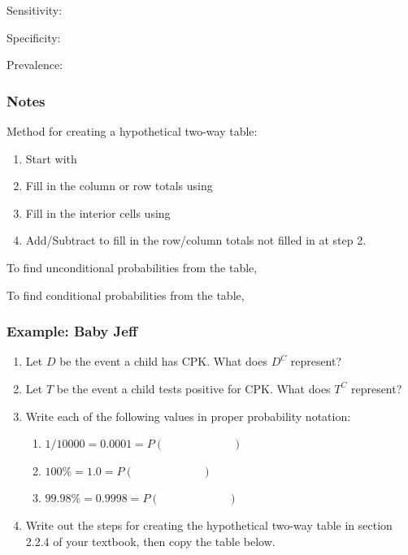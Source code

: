 \documentclass[
]{report}
\providecommand{\tightlist}{%
  \setlength{\itemsep}{0pt}\setlength{\parskip}{0pt}}
\newcommand{\rgs}{\vspace{12pt}} %
\newcommand{\rgi}{\hspace{24pt}}  %
\begin{document}
Sensitivity:
\rgs

Specificity:
\rgs

Prevalence:
\rgs

\hypertarget{notes-25}{%
\subsubsection*{Notes}\label{notes-25}}

Method for creating a hypothetical two-way table:

\begin{enumerate}
\def\labelenumi{\arabic{enumi}.}
\item
  Start with
  \rgs
\item
  Fill in the column or row totals using
  \rgs
\item
  Fill in the interior cells using
  \rgs
\item
  Add/Subtract to fill in the row/column totals not filled in at step 2.
\end{enumerate}

\rgi \rgi To find unconditional probabilities from the table,
\rgs

\rgi \rgi To find conditional probabilities from the table,
\rgs

\hypertarget{example-baby-jeff}{%
\subsubsection*{Example: Baby Jeff}\label{example-baby-jeff}}

\begin{enumerate}
\def\labelenumi{\arabic{enumi}.}
\item
  Let \(D\) be the event a child has CPK. What does \(D^C\) represent?
  \rgs
\item
  Let \(T\) be the event a child tests positive for CPK. What does \(T^C\) represent?
  \rgs
\item
  Write each of the following values in proper probability notation:

  \begin{enumerate}
  \def\labelenumii{\alph{enumii}.}
  \tightlist
  \item
    \(1/10000 = 0.0001 = P( \hspace{1in} )\)
  \item
    \(100\% = 1.0 = P( \hspace{1in} )\)
  \item
    \(99.98\% = 0.9998 = P( \hspace{1in} )\)
  \end{enumerate}
\item
  Write out the steps for creating the hypothetical two-way table in section 2.2.4 of your textbook, then copy the table below.
\end{enumerate}
\end{document}
